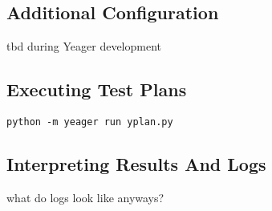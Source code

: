 \subsection{Additional Configuration}
tbd during Yeager development %

\subsection{Executing Test Plans}
\texttt{python -m yeager run yplan.py} %

\subsection{Interpreting Results And Logs}
what do logs look like anyways? %
